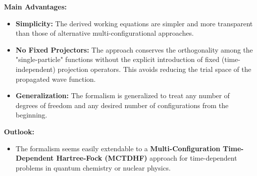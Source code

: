 \begin{frame}
    \textbf{Main Advantages:}
    \begin{itemize}
        \item \textbf{Simplicity:} The derived working equations are simpler and more transparent than those of alternative multi-configurational approaches.
        \item \textbf{No Fixed Projectors:} The approach conserves the orthogonality among the "single-particle" functions without the explicit introduction of fixed (time-independent) projection operators. This avoids reducing the trial space of the propagated wave function.
        \item \textbf{Generalization:} The formalism is generalized to treat any number of degrees of freedom and any desired number of configurations from the beginning.
    \end{itemize}
    
    \textbf{Outlook:}
    \begin{itemize}
        \item The formalism seems easily extendable to a \textbf{Multi-Configuration Time-Dependent Hartree-Fock (MCTDHF)} approach for time-dependent problems in quantum chemistry or nuclear physics.
    \end{itemize}

\end{frame}

